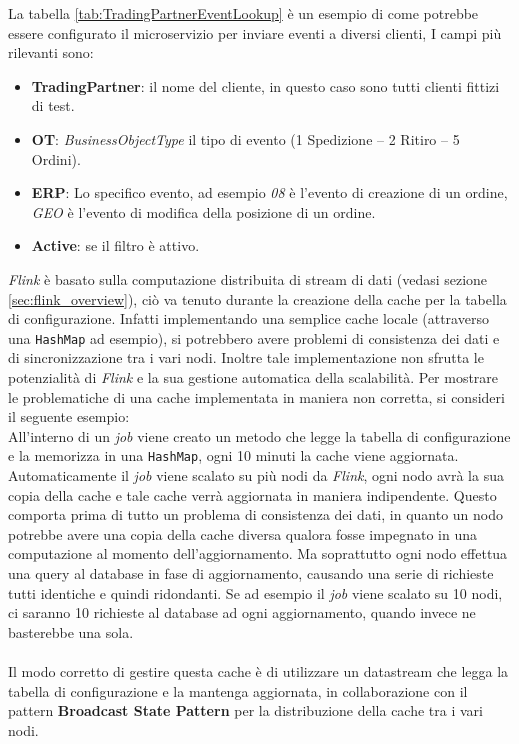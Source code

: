 La tabella \ref{tab:TradingPartnerEventLookup} è un esempio di come potrebbe essere configurato il microservizio per inviare eventi a diversi clienti, I campi più rilevanti sono:
\begin{itemize}
    \item \textbf{TradingPartner}: il nome del cliente, in questo caso sono tutti clienti fittizi di test.
    \item \textbf{OT}: \textit{BusinessObjectType} il tipo di evento (1 Spedizione – 2 Ritiro – 5 Ordini).
    \item \textbf{ERP}: Lo specifico evento, ad esempio \textit{08} è l'evento di creazione di un ordine, \textit{GEO} è l'evento di modifica della posizione di un ordine.
    \item \textbf{Active}: se il filtro è attivo.
\end{itemize}
\textit{Flink} è basato sulla computazione distribuita di stream di dati (vedasi sezione \ref{sec:flink_overview}),
ciò va tenuto durante la creazione della cache per la tabella di configurazione. 
Infatti implementando una semplice cache locale (attraverso una \texttt{HashMap} ad esempio), si potrebbero avere problemi di consistenza dei dati e di sincronizzazione tra i vari nodi.
Inoltre tale implementazione non sfrutta le potenzialità di \textit{Flink} e la sua gestione automatica della scalabilità.
Per mostrare le problematiche di una cache implementata in maniera non corretta, si consideri il seguente esempio:\\
All'interno di un \textit{job}  viene creato un metodo che legge la tabella di configurazione e la memorizza in una \texttt{HashMap}, ogni 10 minuti la cache viene aggiornata.
Automaticamente il \textit{job} viene scalato su più nodi da \textit{Flink}, ogni nodo avrà la sua copia della cache e tale cache verrà aggiornata in maniera indipendente.
Questo comporta prima di tutto un problema di consistenza dei dati, in quanto un nodo potrebbe avere una copia della cache diversa 
qualora fosse impegnato in una computazione al momento dell'aggiornamento.
Ma soprattutto ogni nodo effettua una query al database in fase di aggiornamento, causando una serie di richieste tutti identiche e quindi ridondanti.
Se ad esempio il \textit{job} viene scalato su 10 nodi, ci saranno 10 richieste al database ad ogni aggiornamento, quando invece ne basterebbe una sola.\\\\
Il modo corretto di gestire questa cache è di utilizzare un datastream che legga la tabella di configurazione e la mantenga aggiornata, in collaborazione con il pattern 
\textbf{Broadcast State Pattern} per la distribuzione della cache tra i vari nodi.

